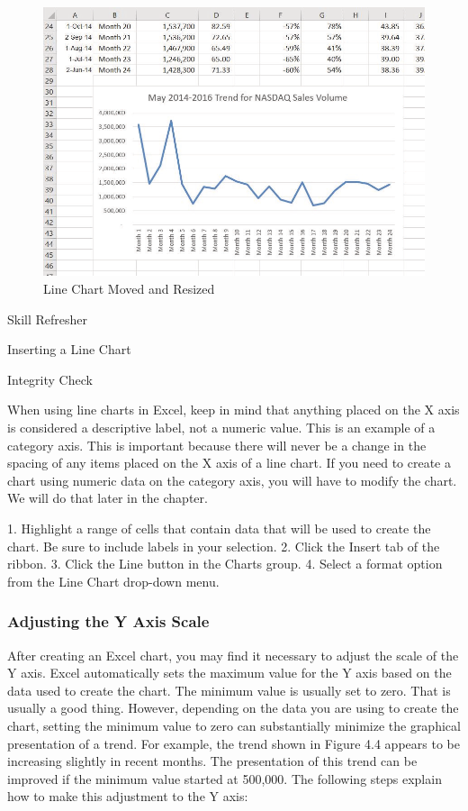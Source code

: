 \begin{figure}[H]
	\centering
	\includegraphics[width=\maxwidth{.95\linewidth}]{gfx/ch04_fig06}
	\caption{Line Chart Moved and Resized}
	\label{04:fig06}
\end{figure}


Skill Refresher


Inserting a Line Chart




Integrity Check

When using line charts in Excel, keep in mind that anything placed on the X axis is considered a descriptive label,
not a numeric value. This is an example of a category axis. This is important because there will never be a change in
the spacing of any items placed on the X axis of a line chart. If you need to create a chart using numeric data on the
category axis, you will have to modify the chart. We will do that later in the chapter.





1. Highlight a range of cells that contain data that will be used to create the chart. Be sure to include labels
in your selection.
2. Click the Insert tab of the ribbon.
3. Click the Line button in the Charts group.
4. Select a format option from the Line Chart drop-down menu.



\subsubsection{Adjusting the Y Axis Scale}

After creating an Excel chart, you may find it necessary to adjust the scale of the Y axis. Excel
automatically sets the maximum value for the Y axis based on the data used to create the chart. The
minimum value is usually set to zero. That is usually a good thing. However, depending on the data
you are using to create the chart, setting the minimum value to zero can substantially minimize the
graphical presentation of a trend. For example, the trend shown in Figure 4.4 appears to be increasing
slightly in recent months. The presentation of this trend can be improved if the minimum value
started at 500,000. The following steps explain how to make this adjustment to the Y axis:

